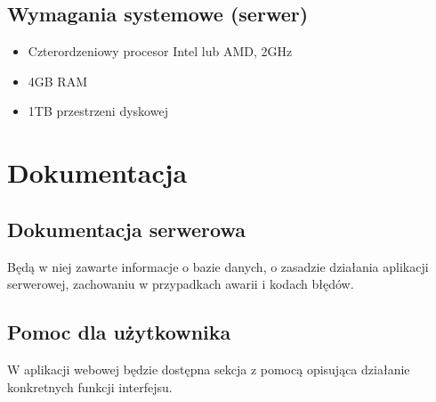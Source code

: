 \documentclass{article}
\begin{document}
\subsection{Wymagania systemowe (serwer)}
\begin{itemize}
    \item Czterordzeniowy procesor Intel lub AMD, 2GHz
    \item 4GB RAM
    \item 1TB przestrzeni dyskowej
\end{itemize}
\section{Dokumentacja}
\subsection{Dokumentacja serwerowa}
Będą w niej zawarte informacje o bazie danych, o zasadzie działania aplikacji serwerowej, zachowaniu 
w przypadkach awarii i kodach błędów.
\subsection{Pomoc dla użytkownika}
W aplikacji webowej będzie dostępna sekcja z pomocą opisująca działanie konkretnych funkcji interfejsu.
\end{document}
